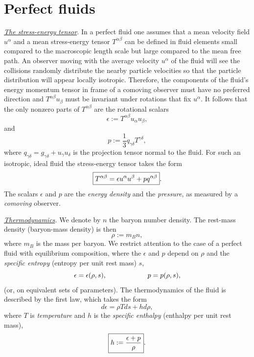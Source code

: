 \documentclass[12pt]{article}
\def\be{\begin{equation}}
\def\ee{\end{equation}}
\begin{document}
\section{Perfect fluids}
\label{s:pf}
\noindent
{\it \uline{The stress-energy tensor}.}
  In a perfect fluid one assumes  that a mean velocity field $u^\alpha$ and a mean
stress-energy tensor $T^{\alpha\beta}$ can be defined in fluid elements small compared to the macroscopic length scale but
large compared to the mean free path.  An
observer moving with the average velocity $u^\alpha$ of the fluid will
see the collisions randomly distribute the nearby particle velocities
so that the particle distribution will appear locally isotropic.
Therefore, the components of the fluid's energy
momentum tensor in frame of a comoving observer must have no preferred direction and
$T^{\alpha\beta}u_\beta$ must be invariant under rotations that fix
$u^\alpha$.
It follows that the only nonzero parts of $T^{\alpha\beta}$ are
the rotational scalars
\be
        \epsilon := T^{\alpha\beta} u_\alpha u_\beta,
\end{equation}
and
\be
        p := \frac13 q_{\gamma\delta}T^{\gamma\delta},
\end{equation}
where $q_{\gamma\delta}= g_{\gamma\delta}+u_\gamma u_\delta$ is the projection tensor normal to the fluid.
For such an isotropic, ideal fluid the  stress-energy tensor 
takes the form
\be
\boxed{T^{\alpha\beta} = \epsilon u^\alpha u^\beta + pq^{\alpha\beta}}.
\index{perfect fluid!stress-energy tensor}\index{stress-energy tensor!perfect fluid}
\index{energy-momentum tensor}
\label{Tab}
\ee
%
The scalars $\epsilon$ and $p$ are the {\it energy density}
 and the {\it pressure}, as measured by a
\textit{comoving} observer.

\vskip0.8cm

\noindent
{\it \uline{Thermodynamics}.}
We denote by $n$ the baryon number density.
The rest-mass density (baryon-mass density) is then
\be
\rho := m_B n, \label{rhoi}
\ee
where $m_B$ is the mass per baryon. We restrict
attention to the case of a perfect fluid with equilibrium 
composition, where the $\epsilon$ and $p$ depend
on  $\rho$ and the {\it specific entropy} 
(entropy per unit rest mass) $s$,
\be
\epsilon = \epsilon(\rho,s),\hskip6em\relax p = p(\rho,s)
\label{eqsti},
\ee
(or, on equivalent sets of parameters). The thermodynamics of the fluid is described by the first law, which takes the form
\be
\boxed{d\epsilon = \rho Tds + h d\rho},
\label{ilaw}
\ee
where $T$ is {\it temperature} and $h$ is the 
{\it specific enthalpy} (enthalpy per unit rest mass), 
\be
\boxed{h := {{\epsilon + p}\over \rho}}. \label{enthi}
\index{enthalpy!relativistic|textbf}\ee
\end{document}
